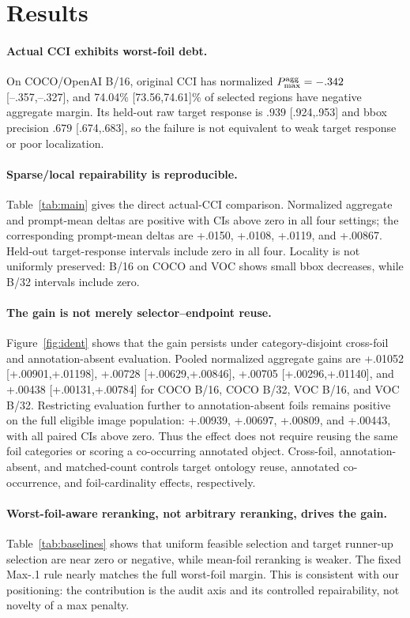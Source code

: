 \documentclass[10pt]{article}
\begin{document}
\section{Results}
\paragraph{Actual CCI exhibits worst-foil debt.}
On COCO/OpenAI B/16, original CCI has normalized
$P_{\max}^{\rm agg}=-.342$ [--.357,--.327], and 74.04\% [73.56,74.61]\% of
selected regions have negative aggregate margin. Its held-out raw target
response is $.939$ [.924,.953] and bbox precision $.679$ [.674,.683], so the
failure is not equivalent to weak target response or poor localization.

\paragraph{Sparse/local repairability is reproducible.}
Table~\ref{tab:main} gives the direct actual-CCI comparison. Normalized aggregate
and prompt-mean deltas are positive with CIs above zero in all four settings;
the corresponding prompt-mean deltas are +.0150, +.0108, +.0119, and +.00867.
Held-out target-response intervals include zero in all four. Locality is not
uniformly preserved: B/16 on COCO and VOC shows small bbox decreases, while B/32
intervals include zero.

\paragraph{The gain is not merely selector--endpoint reuse.}
Figure~\ref{fig:ident} shows that the gain persists under category-disjoint
cross-foil and annotation-absent evaluation. Pooled normalized aggregate gains
are +.01052 [+.00901,+.01198], +.00728 [+.00629,+.00846], +.00705
[+.00296,+.01140], and +.00438 [+.00131,+.00784] for COCO B/16, COCO B/32,
VOC B/16, and VOC B/32. Restricting evaluation further to annotation-absent
foils remains positive on the full eligible image population: +.00939, +.00697,
+.00809, and +.00443, with all paired CIs above zero. Thus the effect does not
require reusing the same foil categories or scoring a co-occurring annotated
object. Cross-foil, annotation-absent, and matched-count controls target ontology
reuse, annotated co-occurrence, and foil-cardinality effects, respectively.

\paragraph{Worst-foil-aware reranking, not arbitrary reranking, drives the gain.}
Table~\ref{tab:baselines} shows that uniform feasible selection and target
runner-up selection are near zero or negative, while mean-foil reranking is
weaker. The fixed Max-.1 rule nearly matches the full worst-foil margin. This is
consistent with our positioning: the contribution is the audit axis and its
controlled repairability, not novelty of a max penalty.
\end{document}
